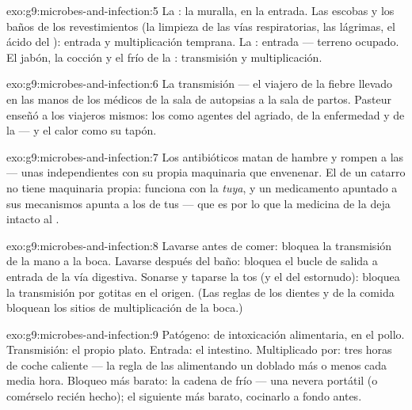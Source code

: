\begin{solution}{exo:g9:microbes-and-infection:5}
La : la muralla, en la entrada. Las escobas y los baños de los
revestimientos (la limpieza de las vías respiratorias, las lágrimas, el
ácido del ): entrada y multiplicación temprana. La : entrada --- terreno ocupado. El jabón, la cocción y el frío
de la : transmisión y multiplicación.
\end{solution}

\begin{solution}{exo:g9:microbes-and-infection:6}
La transmisión --- el viajero de la fiebre llevado en las manos de los
médicos de la sala de autopsias a la sala de partos. Pasteur enseñó a
los viajeros mismos: los  como agentes del agriado, de la
enfermedad y de la  --- y el calor como su tapón.
\end{solution}

\begin{solution}{exo:g9:microbes-and-infection:7}
Los antibióticos matan de hambre y rompen a las  --- unas
 independientes con su propia maquinaria que envenenar. El 
de un catarro no tiene maquinaria propia: funciona con la \emph{tuya},
y un medicamento apuntado a sus mecanismos apunta a los de tus 
--- que es por lo que la medicina de la  deja intacto al .
\end{solution}

\begin{solution}{exo:g9:microbes-and-infection:8}
Lavarse antes de comer: bloquea la transmisión de la mano a la boca.
Lavarse después del baño: bloquea el bucle de salida a entrada de la
vía digestiva. Sonarse y taparse la tos (y el  del estornudo):
bloquea la transmisión por gotitas en el origen. (Las reglas de los
dientes y de la comida bloquean los sitios de multiplicación de la
boca.)
\end{solution}

\begin{solution}{exo:g9:microbes-and-infection:9}
Patógeno:  de intoxicación alimentaria, en el pollo.
Transmisión: el propio plato. Entrada: el intestino. Multiplicado por:
tres horas de coche caliente --- la regla de las 
alimentando un doblado más o menos cada media hora. Bloqueo más barato:
la cadena de frío --- una nevera portátil (o comérselo recién hecho);
el siguiente más barato, cocinarlo a fondo antes.
\end{solution}

